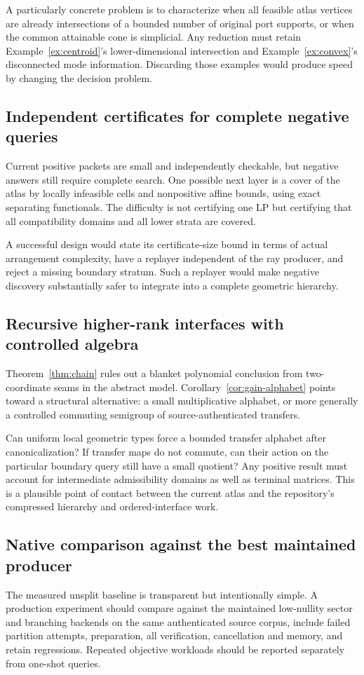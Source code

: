 A particularly concrete problem is to characterize when all feasible atlas vertices are already intersections of a bounded number of original port supports, or when the common attainable cone is simplicial. Any reduction must retain Example~\ref{ex:centroid}'s lower-dimensional intersection and Example~\ref{ex:convex}'s disconnected mode information. Discarding those examples would produce speed by changing the decision problem.

\subsection{Independent certificates for complete negative queries}
Current positive packets are small and independently checkable, but negative answers still require complete search. One possible next layer is a cover of the atlas by locally infeasible cells and nonpositive affine bounds, using exact separating functionals. The difficulty is not certifying one LP but certifying that all compatibility domains and all lower strata are covered.

A successful design would state its certificate-size bound in terms of actual arrangement complexity, have a replayer independent of the ray producer, and reject a missing boundary stratum. Such a replayer would make negative discovery substantially safer to integrate into a complete geometric hierarchy.

\subsection{Recursive higher-rank interfaces with controlled algebra}
Theorem~\ref{thm:chain} rules out a blanket polynomial conclusion from two-coordinate seams in the abstract model. Corollary~\ref{cor:gain-alphabet} points toward a structural alternative: a small multiplicative alphabet, or more generally a controlled commuting semigroup of source-authenticated transfers.

Can uniform local geometric types force a bounded transfer alphabet after canonicalization? If transfer maps do not commute, can their action on the particular boundary query still have a small quotient? Any positive result must account for intermediate admissibility domains as well as terminal matrices. This is a plausible point of contact between the current atlas and the repository's compressed hierarchy and ordered-interface work.

\subsection{Native comparison against the best maintained producer}
The measured unsplit baseline is transparent but intentionally simple. A production experiment should compare against the maintained low-nullity sector and branching backends on the same authenticated source corpus, include failed partition attempts, preparation, all verification, cancellation and memory, and retain regressions. Repeated objective workloads should be reported separately from one-shot queries.


